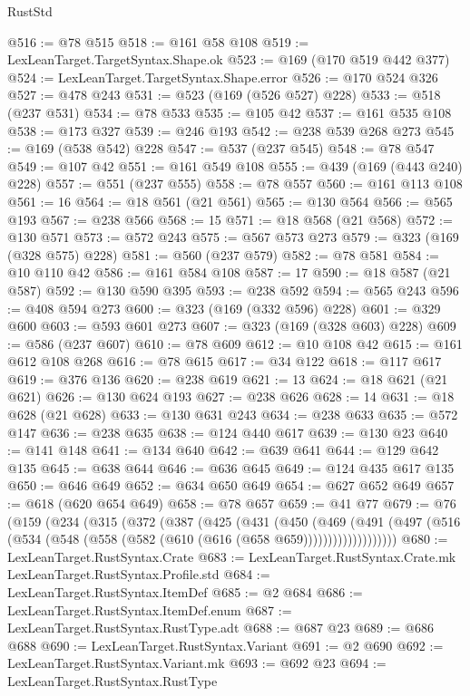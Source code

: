 \begin{lexlean}{RustStd}
\begin{coremodule}
@516 := @78 @515
@518 := @161 @58 @108
@519 := LexLeanTarget.TargetSyntax.Shape.ok
@523 := @169 (@170 @519 @442 @377)
@524 := LexLeanTarget.TargetSyntax.Shape.error
@526 := @170 @524 @326
@527 := @478 @243
@531 := @523 (@169 (@526 @527) @228)
@533 := @518 (@237 @531)
@534 := @78 @533
@535 := @105 @42
@537 := @161 @535 @108
@538 := @173 @327
@539 := @246 @193
@542 := @238 @539 @268 @273
@545 := @169 (@538 @542) @228
@547 := @537 (@237 @545)
@548 := @78 @547
@549 := @107 @42
@551 := @161 @549 @108
@555 := @439 (@169 (@443 @240) @228)
@557 := @551 (@237 @555)
@558 := @78 @557
@560 := @161 @113 @108
@561 := 16
@564 := @18 @561 (@21 @561)
@565 := @130 @564
@566 := @565 @193
@567 := @238 @566
@568 := 15
@571 := @18 @568 (@21 @568)
@572 := @130 @571
@573 := @572 @243
@575 := @567 @573 @273
@579 := @323 (@169 (@328 @575) @228)
@581 := @560 (@237 @579)
@582 := @78 @581
@584 := @10 @110 @42
@586 := @161 @584 @108
@587 := 17
@590 := @18 @587 (@21 @587)
@592 := @130 @590 @395
@593 := @238 @592
@594 := @565 @243
@596 := @408 @594 @273
@600 := @323 (@169 (@332 @596) @228)
@601 := @329 @600
@603 := @593 @601 @273
@607 := @323 (@169 (@328 @603) @228)
@609 := @586 (@237 @607)
@610 := @78 @609
@612 := @10 @108 @42
@615 := @161 @612 @108 @268
@616 := @78 @615
@617 := @34 @122
@618 := @117 @617
@619 := @376 @136
@620 := @238 @619
@621 := 13
@624 := @18 @621 (@21 @621)
@626 := @130 @624 @193
@627 := @238 @626
@628 := 14
@631 := @18 @628 (@21 @628)
@633 := @130 @631 @243
@634 := @238 @633
@635 := @572 @147
@636 := @238 @635
@638 := @124 @440 @617
@639 := @130 @23
@640 := @141 @148
@641 := @134 @640
@642 := @639 @641
@644 := @129 @642 @135
@645 := @638 @644
@646 := @636 @645
@649 := @124 @435 @617 @135
@650 := @646 @649
@652 := @634 @650 @649
@654 := @627 @652 @649
@657 := @618 (@620 @654 @649)
@658 := @78 @657
@659 := @41 @77
@679 := @76
    (@159
      (@234
        (@315
          (@372
            (@387
              (@425
                (@431
                  (@450
                    (@469
                      (@491
                        (@497
                          (@516 (@534 (@548 (@558 (@582 (@610 (@616 (@658 @659)))))))))))))))))))
@680 := LexLeanTarget.RustSyntax.Crate
@683 := LexLeanTarget.RustSyntax.Crate.mk LexLeanTarget.RustSyntax.Profile.std
@684 := LexLeanTarget.RustSyntax.ItemDef
@685 := @2 @684
@686 := LexLeanTarget.RustSyntax.ItemDef.enum
@687 := LexLeanTarget.RustSyntax.RustType.adt
@688 := @687 @23
@689 := @686 @688
@690 := LexLeanTarget.RustSyntax.Variant
@691 := @2 @690
@692 := LexLeanTarget.RustSyntax.Variant.mk
@693 := @692 @23
@694 := LexLeanTarget.RustSyntax.RustType

\end{coremodule}
\end{lexlean}
